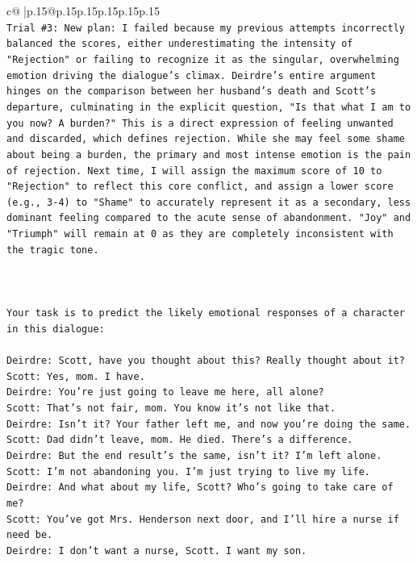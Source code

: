 \documentclass{article}
\begin{document}
{\begin{supertabular}{c@{$\;$}|p{.15\linewidth}@{}p{.15\linewidth}p{.15\linewidth}p{.15\linewidth}p{.15\linewidth}p{.15\linewidth}}
{{{\\ 
\texttt{Trial \#3: New plan: I failed because my previous attempts incorrectly balanced the scores, either underestimating the intensity of "Rejection" or failing to recognize it as the singular, overwhelming emotion driving the dialogue's climax. Deirdre's entire argument hinges on the comparison between her husband's death and Scott's departure, culminating in the explicit question, "Is that what I am to you now? A burden?" This is a direct expression of feeling unwanted and discarded, which defines rejection. While she may feel some shame about being a burden, the primary and most intense emotion is the pain of rejection. Next time, I will assign the maximum score of 10 to "Rejection" to reflect this core conflict, and assign a lower score (e.g., 3{-}4) to "Shame" to accurately represent it as a secondary, less dominant feeling compared to the acute sense of abandonment. "Joy" and "Triumph" will remain at 0 as they are completely inconsistent with the tragic tone.} \\
\\ 
\\ 
\\ 
\texttt{Your task is to predict the likely emotional responses of a character in this dialogue:} \\
\\ 
\texttt{Deirdre: Scott, have you thought about this? Really thought about it?} \\
\texttt{Scott: Yes, mom. I have. } \\
\texttt{Deirdre: You're just going to leave me here, all alone?} \\
\texttt{Scott: That's not fair, mom. You know it's not like that.} \\
\texttt{Deirdre: Isn't it? Your father left me, and now you're doing the same.} \\
\texttt{Scott: Dad didn't leave, mom. He died. There's a difference.} \\
\texttt{Deirdre: But the end result's the same, isn't it? I'm left alone.} \\
\texttt{Scott: I'm not abandoning you. I'm just trying to live my life.} \\
\texttt{Deirdre: And what about my life, Scott? Who's going to take care of me?} \\
\texttt{Scott: You've got Mrs. Henderson next door, and I'll hire a nurse if need be.} \\
\texttt{Deirdre: I don't want a nurse, Scott. I want my son.} \\
}}}
\end{supertabular}}
\end{document}
